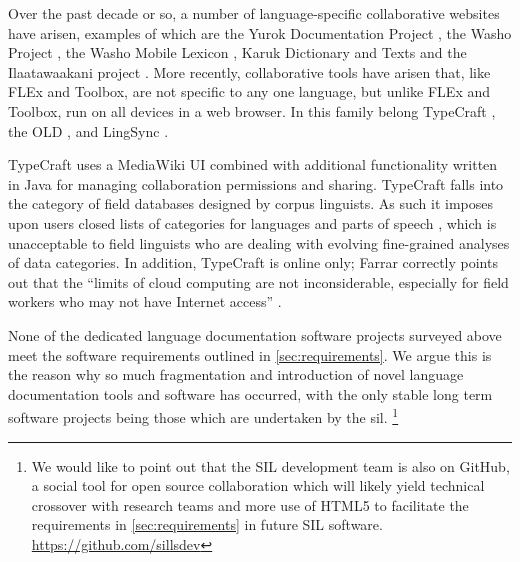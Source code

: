 \documentclass[11pt]{article}
\newcommand{\smalltodo}[2][]
    {\todo[caption={#2}, #1]
    {\tiny#2\normalsize}}
\begin{document}
Over the past decade or so, a number of language-specific collaborative 
websites have arisen, examples of which are  
the Yurok Documentation Project \cite{Yurok:2001:Online},
the Washo Project \cite{Washo:2005:Online,Cihlar:2008}, the Washo
Mobile Lexicon \cite{WashoMobile:2008:Online}, Karuk Dictionary and Texts
\cite{Karuk:2009:Online} and the Ilaatawaakani project \cite{Troy:2014}.
More recently, collaborative  tools have arisen that, like FLEx and Toolbox,
are not specific to any one language, but unlike FLEx and Toolbox, run on all devices in a web
browser.  In this family belong TypeCraft \cite{Beermann:2012}, the OLD
\cite{dunham2014docs}, and LingSync \cite{lingsync:2012}.

TypeCraft uses a MediaWiki UI combined with additional functionality written in
Java for managing collaboration permissions and sharing. TypeCraft falls into
the category of field databases designed by corpus linguists. As such it
imposes upon users closed lists of categories for languages and parts of speech
\cite{Farrar:2010}, which is unacceptable to field linguists who are
dealing with evolving fine-grained analyses of data categories. In addition,
TypeCraft is online only; Farrar correctly points out that the ``limits of cloud computing
are not inconsiderable, especially for field workers who may not have Internet
access'' \cite{Farrar:2010}.%

None of the dedicated language documentation software projects surveyed above 
meet the software requirements outlined in \autoref{sec:requirements}. 
We argue this is the reason why so much fragmentation and introduction of novel language documentation tools and software has occurred, with the only stable long term software projects being those which are undertaken by the \gls{sil}.%
\footnote{We would like to point out that the SIL development team is also on GitHub,  a social tool for open source collaboration which will likely yield technical crossover with research teams and more use of HTML5 to facilitate the requirements in \autoref{sec:requirements} in future SIL software. \url{https://github.com/sillsdev}}
%

\end{document}
